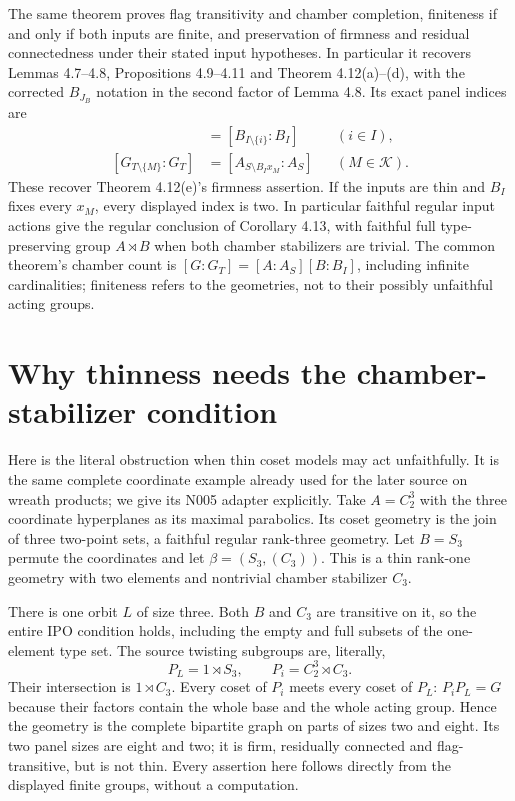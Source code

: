 The same theorem proves flag transitivity and chamber completion,
finiteness if and only if both inputs are finite, and preservation of
firmness and residual connectedness under their stated input
hypotheses. In particular it recovers Lemmas 4.7--4.8,
Propositions 4.9--4.11 and Theorem 4.12(a)--(d), with the corrected
$B_{J_B}$ notation in the second factor of Lemma 4.8. Its exact
panel indices are
\begin{align*}
 [G_{T\setminus\{i\}}:G_T]
   &=[B_{I\setminus\{i\}}:B_I] &&(i\in I),\\
 [G_{T\setminus\{M\}}:G_T]
   &=[A_{S\setminus B_Ix_M}:A_S] &&(M\in\mathcal K).
\end{align*}
These recover Theorem 4.12(e)'s firmness assertion. If the inputs are
thin and $B_I$ fixes every $x_M$, every displayed index is two.
In particular faithful regular input actions give the regular
conclusion of Corollary 4.13, with faithful full type-preserving
group $A\rtimes B$ when both chamber stabilizers are trivial.
The common theorem's chamber count is
$[G:G_T]=[A:A_S][B:B_I]$, including infinite cardinalities;
finiteness refers to the geometries, not to their possibly
unfaithful acting groups.

\section{Why thinness needs the chamber-stabilizer condition}
Here is the literal obstruction when thin coset models may act
unfaithfully. It is the same complete coordinate example already
used for the later source on wreath products; we give its N005
adapter explicitly. Take $A=C_2^3$ with the three coordinate
hyperplanes as its maximal parabolics. Its coset geometry is the
join of three two-point sets, a faithful regular rank-three geometry.
Let $B=S_3$ permute the coordinates and let
$\beta=(S_3,(C_3))$. This is a thin rank-one geometry with two
elements and nontrivial chamber stabilizer $C_3$.

There is one orbit $L$ of size three. Both $B$ and $C_3$ are
transitive on it, so the entire IPO condition holds, including the
empty and full subsets of the one-element type set. The source
twisting subgroups are, literally,
\[
 P_L=1\rtimes S_3,
 \qquad P_i=C_2^3\rtimes C_3.
\]
Their intersection is $1\rtimes C_3$. Every coset of $P_i$ meets
every coset of $P_L$: $P_iP_L=G$ because their factors contain the
whole base and the whole acting group. Hence the geometry is the
complete bipartite graph on parts of sizes two and eight. Its two
panel sizes are eight and two; it is firm, residually connected and
flag-transitive, but is not thin. Every assertion here follows
directly from the displayed finite groups, without a computation.

